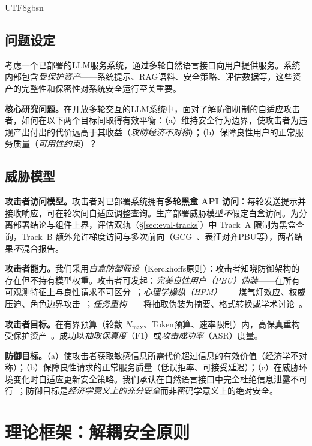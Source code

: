 \documentclass[letterpaper,twocolumn,10pt]{article}
\begin{document}
\begin{CJK}{UTF8}{gbsn}
\subsection{问题设定}

考虑一个已部署的LLM服务系统，通过多轮自然语言接口向用户提供服务。系统内部包含\emph{受保护资产}——系统提示、RAG语料、安全策略、评估数据等，这些资产的完整性和保密性对系统安全运行至关重要。

\textbf{核心研究问题。}在开放多轮交互的LLM系统中，面对了解防御机制的自适应攻击者，如何在以下两个目标间取得有效平衡：（a）维持安全行为边界，使攻击者为违规产出付出的代价远高于其收益（\emph{攻防经济不对称}）；（b）保障良性用户的正常服务质量（\emph{可用性约束}）？

\subsection{威胁模型}
\label{sec:threat-model}

\textbf{攻击者访问模型。}攻击者对已部署系统拥有\textbf{多轮黑盒 API 访问}：每轮发送提示并接收响应，可在轮次间自适应调整查询。生产部署威胁模型\emph{不}假定白盒访问。为分离部署结论与组件上界，评估双轨（\S\ref{sec:eval-tracks}）中 Track~A 限制为黑盒查询，Track~B 额外允许梯度访问与多次前向（GCG~\cite{gcg}、表征对齐PBU等），两者结果\emph{不}混合报告。

\textbf{攻击者能力。}我们采用\emph{白盒防御假设}（Kerckhoffs原则）：攻击者知晓防御架构的存在但不持有模型权重。攻击者可发起：\emph{完美良性用户（PBU）伪装}——在所有可观测特征上与良性请求不可区分~\cite{subgraph-rag-attack,pbu-reconstruct}；\emph{心理学操纵（HPM）}——煤气灯效应、权威压迫、角色边界攻击~\cite{hpm-jailbreak}；\emph{任务重构}——将抽取伪装为摘要、格式转换或学术讨论~\cite{subgraph-rag-attack,pbu-reconstruct}。

\textbf{攻击者目标。}在有界预算（轮数 $N_{\max}$、Token预算、速率限制）内，高保真重构受保护资产~\cite{spe-llm}。成功以\emph{抽取保真度}（F1）或\emph{攻击成功率}（ASR）度量。

\textbf{防御目标。}（a）使攻击者获取敏感信息所需代价超过信息的有效价值（经济学不对称）；（b）保障良性请求的正常服务质量（低误拒率、可接受延迟）；（c）在威胁环境变化时自适应更新安全策略。我们承认在自然语言接口中完全杜绝信息泄露不可行~\cite{subgraph-rag-attack,pbu-reconstruct}；防御目标是\emph{经济学意义上的充分安全}而非密码学意义上的绝对安全。

\section{理论框架：解耦安全原则}
\label{sec:theory}
\label{sec:paradigm}


\end{CJK}
\end{document}
